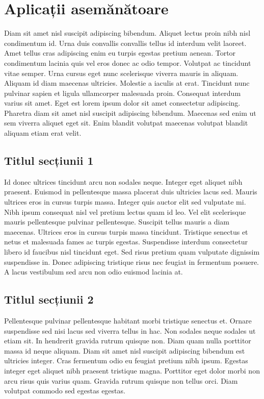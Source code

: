 \chapter{Aplicații asemănătoare}

Diam sit amet nisl suscipit adipiscing bibendum. Aliquet lectus proin nibh nisl condimentum id. Urna duis convallis convallis tellus id interdum velit laoreet. Amet tellus cras adipiscing enim eu turpis egestas pretium aenean. Tortor condimentum lacinia quis vel eros donec ac odio tempor. Volutpat ac tincidunt vitae semper. Urna cursus eget nunc scelerisque viverra mauris in aliquam. Aliquam id diam maecenas ultricies. Molestie a iaculis at erat. Tincidunt nunc pulvinar sapien et ligula ullamcorper malesuada proin. Consequat interdum varius sit amet. Eget est lorem ipsum dolor sit amet consectetur adipiscing. Pharetra diam sit amet nisl suscipit adipiscing bibendum. Maecenas sed enim ut sem viverra aliquet eget sit. Enim blandit volutpat maecenas volutpat blandit aliquam etiam erat velit.

\section{Titlul secțiunii 1}

Id donec ultrices tincidunt arcu non sodales neque. Integer eget aliquet nibh praesent. Euismod in pellentesque massa placerat duis ultricies lacus sed. Mauris ultrices eros in cursus turpis massa. Integer quis auctor elit sed vulputate mi. Nibh ipsum consequat nisl vel pretium lectus quam id leo. Vel elit scelerisque mauris pellentesque pulvinar pellentesque. Suscipit tellus mauris a diam maecenas. Ultrices eros in cursus turpis massa tincidunt. Tristique senectus et netus et malesuada fames ac turpis egestas. Suspendisse interdum consectetur libero id faucibus nisl tincidunt eget. Sed risus pretium quam vulputate dignissim suspendisse in. Donec adipiscing tristique risus nec feugiat in fermentum posuere. A lacus vestibulum sed arcu non odio euismod lacinia at.

\section{Titlul secțiunii 2}

Pellentesque pulvinar pellentesque habitant morbi tristique senectus et. Ornare suspendisse sed nisi lacus sed viverra tellus in hac. Non sodales neque sodales ut etiam sit. In hendrerit gravida rutrum quisque non. Diam quam nulla porttitor massa id neque aliquam. Diam sit amet nisl suscipit adipiscing bibendum est ultricies integer. Cras fermentum odio eu feugiat pretium nibh ipsum. Egestas integer eget aliquet nibh praesent tristique magna. Porttitor eget dolor morbi non arcu risus quis varius quam. Gravida rutrum quisque non tellus orci. Diam volutpat commodo sed egestas egestas.